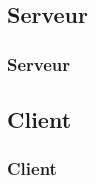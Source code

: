 \subsection{Serveur}
	\begin{frame}
		\frametitle{Serveur}
	\end{frame}

\subsection{Client}
	\begin{frame}
		\frametitle{Client}
	\end{frame}
